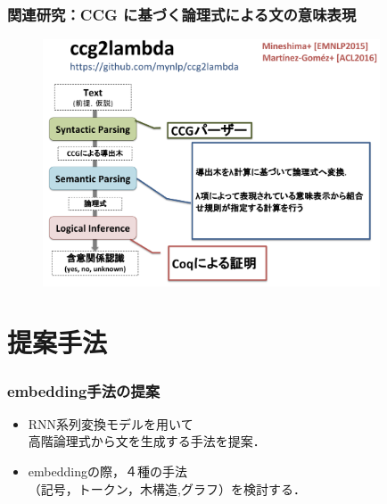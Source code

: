 \documentclass[dvipdfmx]{beamer}
\begin{document}
\begin{frame}
\frametitle{関連研究：CCG に基づく論理式による文の意味表現}
\begin{center}
\begin{figure}[h]
	\includegraphics[width=10cm]{c2l.png}
        \label{fig:c2l}
\end{figure}
\end{center}

\end{frame}




\section{提案手法}
\begin{frame}
\frametitle{embedding手法の提案}
\begin{center}
\end{center}
\begin{itemize}
  \item RNN系列変換モデルを用いて\\高階論理式から文を生成する手法を提案．
  \item embeddingの際，４種の手法\\{\color{berry}（記号，トークン，木構造,グラフ）}を検討する．
\end{itemize}

\end{frame}
\end{document}
